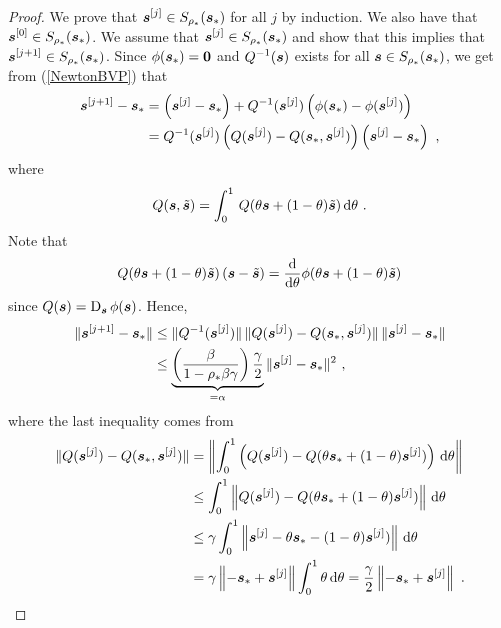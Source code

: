 \begin{proof}
We prove that
$\displaystyle \bm{s}^{[j]} \in S_{\rho_\ast}(\bm{s}_\ast)$ for all $j$
by induction.  We also have that
$\displaystyle \bm{s}^{[0]} \in S_{\rho_\ast}(\bm{s}_\ast)$.
We assume that $\displaystyle \bm{s}^{[j]} \in S_{\rho_\ast}(\bm{s}_\ast)$
and show that this implies that
$\displaystyle \bm{s}^{[j+1]} \in S_{\rho_\ast}(\bm{s}_\ast)$.
Since $\phi(\bm{s}_\ast) = \bm{0}$ and $\displaystyle Q^{-1}(\bm{s})$
exists for all $\bm{s} \in S_{\rho_\ast}(\bm{s}_\ast)$, we get
from (\ref{NewtonBVP}) that
\begin{align*}
\bm{s}^{[j+1]} - \bm{s}_\ast &= \left( \bm{s}^{[j]} - \bm{s}_\ast \right)
+ Q^{-1}(\bm{s}^{[j]}) \left( \phi(\bm{s}_\ast) -
\phi(\bm{s}^{[j]})\right) \\
&= Q^{-1}(\bm{s}^{[j]}) \left( Q(\bm{s}^{[j]}) -
Q(\bm{s}_\ast, \bm{s}^{[j]}) \right) \left( \bm{s}^{[j]}
- \bm{s}_\ast \right)  \ ,
\end{align*}
where
\[
Q(\bm{s},\tilde{\bm{s}}) = \int_0^1 \,
Q(\theta \bm{s} + (1-\theta) \tilde{\bm{s}}) \,\mathrm{d}\theta \ .
\]
Note that
\[
Q(\theta \bm{s} + (1-\theta)\tilde{\bm{s}})
\left(\bm{s} - \tilde{\bm{s}} \right) =
\frac{\mathrm{d}}{\mathrm{d}{\theta}}{\phi(\theta \bm{s} + (1-\theta)\tilde{\bm{s}})}
\]
since $\displaystyle Q(\bm{s}) = \operatorname{D}_{\bm{s}}\phi(\bm{s})$.
Hence,
\begin{align}
\| \bm{s}^{[j+1]} - \bm{s}_\ast \|
& \leq \| Q^{-1}(\bm{s}^{[j]}) \|\,
\| Q(\bm{s}^{[j]}) - Q(\bm{s}_\ast,\bm{s}^{[j]}) \| \,
\| \bm{s}^{[j]} - \bm{s}_\ast \| \nonumber \\
&\leq
\underbrace{\left(\frac{\beta}{1-\rho_\ast \beta\gamma}\right)
\frac{\gamma}{2}}_{=\alpha}
\| \bm{s}^{[j]} - \bm{s}_\ast \|^2 \ , \label{Pcontract}
\end{align}
where the last inequality comes from
\begin{align}
\| Q(\bm{s}^{[j]}) - Q(\bm{s}_\ast,\bm{s}^{[j]}) \|
&= \left\| \int_0^1 \left( Q(\bm{s}^{[j]}) - 
Q(\theta \bm{s}_\ast + (1-\theta)\bm{s}^{[j]}) \right) \,\mathrm{d}\theta \right\|
\nonumber \\
& \leq \int_0^1 \left\| Q(\bm{s}^{[j]}) - 
Q(\theta \bm{s}_\ast + (1-\theta)\bm{s}^{[j]}) \right\| \,\mathrm{d}\theta
\nonumber \\
& \leq \gamma \int_0^1 \left\| \bm{s}^{[j]} - 
\theta \bm{s}_\ast - (1-\theta)\bm{s}^{[j]}) \right\| \,\mathrm{d}\theta
\nonumber \\
& = \gamma  \left\|-\bm{s}_\ast +\bm{s}^{[j]} \right\|
\int_0^1 \theta  \,\mathrm{d}\theta
= \frac{\gamma}{2}  \left\|-\bm{s}_\ast +\bm{s}^{[j]} \right\| \ .
\label{CforNewtonInt}
\end{align}


\end{proof}
